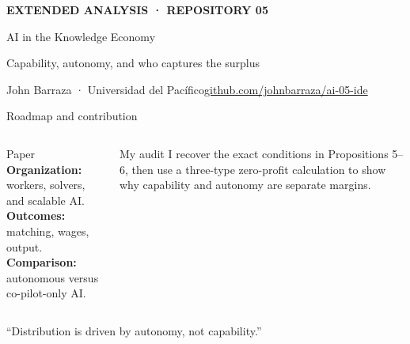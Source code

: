 \documentclass[aspectratio=169,10pt]{beamer}
\begin{document}
\begin{frame}[plain]
\vspace{.42cm}
{\color{IDERed}\large\bfseries EXTENDED ANALYSIS · REPOSITORY 05}\par\vspace{.28cm}
{\color{IDENavy}AI in the Knowledge Economy}\par\vspace{.2cm}
{\large Capability, autonomy, and who captures the surplus}\par\vspace{.48cm}
\vfill
John Barraza · Universidad del Pacífico\hfill\href{\repoURL}{github.com/johnbarraza/ai-05-ide}
\end{frame}

\begin{frame}{Roadmap and contribution}
\small
\begin{columns}[T,onlytextwidth]
\begin{block}{Paper}
\textbf{Organization:} workers, solvers, and scalable AI.\\[.15cm]
\textbf{Outcomes:} matching, wages, output.\\[.15cm]
\textbf{Comparison:} autonomous versus co-pilot-only AI.
\end{block}
\begin{alertblock}{My audit}
I recover the exact conditions in Propositions 5–6, then use a three-type zero-profit calculation to show why capability and autonomy are separate margins.
\end{alertblock}
\end{columns}
\vspace{.22cm}
\centering
{}\quad “Distribution is driven by autonomy, not capability.”
\end{frame}
\end{document}
